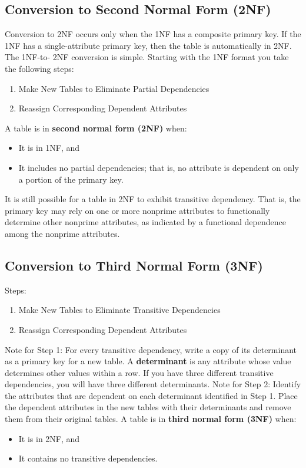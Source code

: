 \documentclass[a4paper, 12pt, titlepage]{report}
\begin{document}
{\subsection{Conversion to Second Normal Form (2NF)}
Conversion to 2NF occurs only when the 1NF has a composite primary key. If the 1NF has a single-attribute primary key, then the table is automatically in 2NF. The 1NF-to- 2NF conversion is simple. Starting with the 1NF format you take the following steps:
\begin{enumerate}
\item Make New Tables to Eliminate Partial Dependencies
\item Reassign Corresponding Dependent Attributes
\end{enumerate}
A table is in \textbf{second normal form (2NF)} when:
\begin{itemize}
\item It is in 1NF, and
\item It includes no partial dependencies; that is, no attribute is dependent on only a portion of the primary key.
\end{itemize}
It is still possible for a table in 2NF to exhibit transitive dependency. That is, the primary key may rely on one or more nonprime attributes to functionally determine other nonprime attributes, as indicated by a functional dependence among the nonprime attributes.
\subsection{Conversion to Third Normal Form (3NF)}
Steps:
\begin{enumerate}
\item Make New Tables to Eliminate Transitive Dependencies
\item Reassign Corresponding Dependent Attributes
\end{enumerate}
Note for Step 1: For every transitive dependency, write a copy of its determinant as a primary key for a new table.
A \textbf{determinant} is any attribute whose value determines other values within a row. If you have three different transitive dependencies, you will have three different determinants.
Note for Step 2: Identify the attributes that are dependent on each determinant identified in Step 1. Place the dependent attributes in the new tables with their determinants and remove them from their original tables.
A table is in \textbf{third normal form (3NF)} when:
\begin{itemize}
\item It is in 2NF, and
\item It contains no transitive dependencies.
\end{itemize}
}
\end{document}
